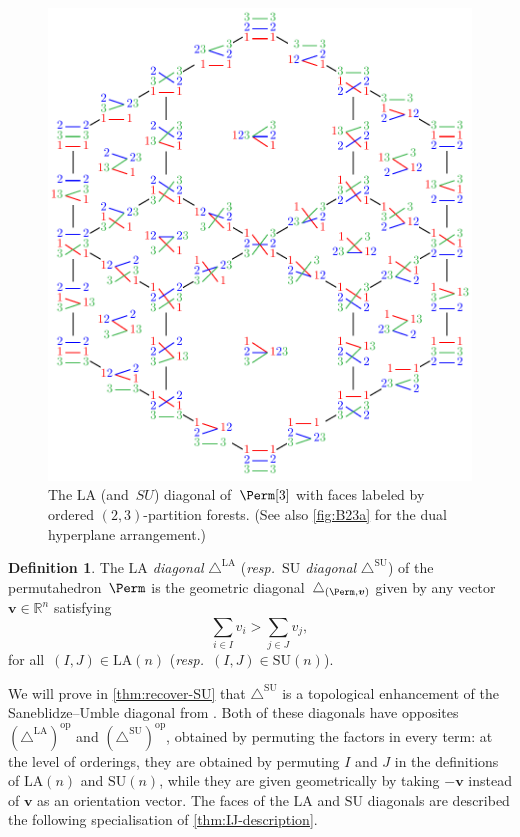 \documentclass{amsart}
\newcommand{\darkblue}{\color{darkblue}} %
\theoremstyle{definition}
\newtheorem{definition}[theorem]{Definition}
\newcommand{\R}{\mathbb{R}} %
\renewcommand{\b}[1]{{\boldsymbol{#1}}} %
\newcommand{\resp}{\textit{resp.}~} %
\newcommand{\defn}[1]{\textsl{\darkblue #1}} %
\renewcommand{\b}[1]{\boldsymbol{#1}} %
\newcommand{\SU}{\mathrm{SU}}
\newcommand{\LA}{\mathrm{LA}}
\newcommand{\SUD}{\triangle^{\mathrm{SU}}}
\newcommand{\LAD}{\triangle^{\mathrm{LA}}}
\newcommand{\op}{\mathrm{op}}
\begin{document}
\begin{figure}
	\centerline{\includegraphics[scale=1]{diagonalPermutahedron3}}
	\caption{The $\LA$ (and~$SU$) diagonal of~$\Perm[3]$ with faces labeled by ordered $(2,3)$-partition forests. (See also \cref{fig:B23a} for the dual hyperplane arrangement.)}
	\label{fig:LUSAdiagonals}
\end{figure}

\begin{definition}
\label{def:LA-and-SU}
The \defn{$\LA$ diagonal} $\LAD$ (\resp \defn{$\SU$ diagonal} $\SUD$) of the permutahedron~$\Perm$ is the geometric diagonal~$\triangle_{(\Perm,\b{v})}$ given by any vector $\b{v} \in \R^n$ satisfying  
\[
\sum_{i \in I} v_i > \sum_{j \in J} v_j,
\]
for all~$(I,J) \in \LA(n)$ (\resp $(I,J) \in \SU(n)$).
\end{definition}

We will prove in \cref{thm:recover-SU} that $\SUD$ is a topological enhancement of the Saneblidze--Umble diagonal from \cite{SaneblidzeUmble}.
Both of these diagonals have opposites $(\LAD)^{\op}$ and $(\SUD)^{\op}$, obtained by permuting the factors in every term: at the level of orderings, they are obtained by permuting $I$ and $J$ in the definitions of $\LA(n)$ and $\SU(n)$, while they are given geometrically by taking $-\b{v}$ instead of $\b{v}$ as an orientation vector. 
The faces of the $\LA$ and $\SU$ diagonals are described the following specialisation of \cref{thm:IJ-description}.
\end{document}
